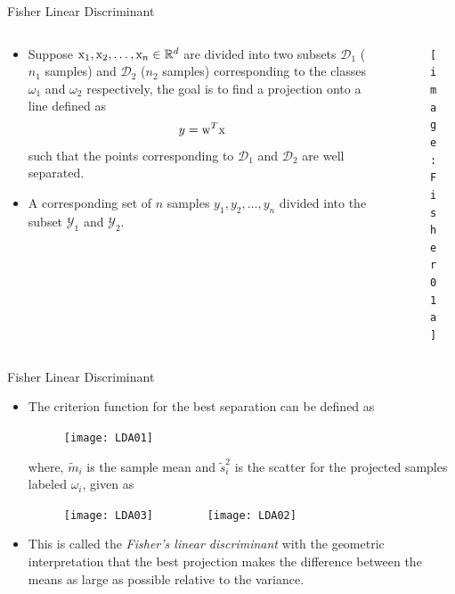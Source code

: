 \begin{frame}{Fisher Linear Discriminant}
\begin{columns}
\begin{column}{7cm}
\begin{itemize}
\item Suppose ${\rm x}_1,{\rm x}_2,\ldots,{\rm x}_n\in \mathbb{R}^d$ are divided into two subsets $\mathcal{D}_1$ ($n_1$  samples) and $\mathcal{D}_2$ ($n_2$  samples)
corresponding to the classes $\omega_1$ and $\omega_2$ respectively, the
goal is to find a projection onto a line defined as
\begin{equation}
{y}={\rm w}^T{\rm x} \nonumber
\end{equation}
such that the points corresponding to $\mathcal{D}_1$ and $\mathcal{D}_2$ are well separated.
\item A corresponding set of $n$ samples ${y}_1,{y}_2,\ldots,{y}_n$ divided into the subset $\mathcal{Y}_1$ and $\mathcal{Y}_2$.\nocite{duda2012pattern}
\end{itemize}
\end{column}
\begin{column}{6cm}
\begin{figure}
\texttt{[image: Fisher01a]}
\end{figure}
\end{column}
\end{columns}
\end{frame}

\begin{frame}{Fisher Linear Discriminant}
\begin{itemize}
\item The criterion function for the best separation can be defined as
\begin{figure}
\texttt{[image: LDA01]}
\end{figure}
where, $\tilde{m}_i$ is the sample mean and $\tilde{s}_i^2$ is the scatter for the projected samples labeled $\omega_i$, given as
\begin{figure}
\texttt{[image: LDA03]}~~~~~~~~
\texttt{[image: LDA02]}
\end{figure}
\item This is called the \textit{\color{mycolor2}Fisher's linear discriminant} with the
geometric interpretation that the best projection makes the
difference between the means as large as possible relative
to the variance.
\end{itemize}
\end{frame}

